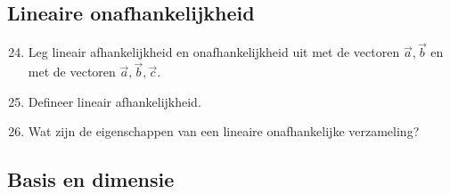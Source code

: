 \documentclass[12pt]{article}
\begin{document}
    \subsection{Lineaire onafhankelijkheid}
    \begin{enumerate}
        \setcounter{enumi}{23}
        \item Leg lineair afhankelijkheid en onafhankelijkheid uit met de vectoren $\vec{a}, \vec{b}$ en met de vectoren $\vec{a}, \vec{b} , \vec{c}$.
        \item Defineer lineair afhankelijkheid.
        \item Wat zijn de eigenschappen van een lineaire onafhankelijke verzameling?
    \end{enumerate}
    \subsection{Basis en dimensie}
\end{document}
